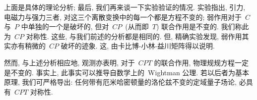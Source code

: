 上面是具体的理论分析; 最后, 我们再来谈一下实验验证的情况. 实验指出, 引力, 电磁力与强力三者, 对这三个离散变换中的每一个都是方程不变的; 弱作用对于~$C$ 与~$P$ 中单独的一个是破坏的, 但对~$CP$~(从而即~$T$) 联合作用是不变的. 我们称此为~$CP$ 对称性. 这些, 与我们前述的分析都是相同的. 但, 精确实验发现, 弱作用其实亦有稍微的~$CP$ 破坏的迹象. 这, 由卡比博-小林-益川矩阵得以说明.

然而, 与上述分析相应地, 观测亦表明, 对于~$CPT$ 的联合作用, 物理规规方程一定是不变的. 事实上, 此事实可以推导自数学上的~Wightman 公理. 若以后者为基本原理, 我们可严格导出: 任何带有厄米哈密顿量的洛伦兹不变的定域量子场论, 必具有~$CPT$ 对称性.








































